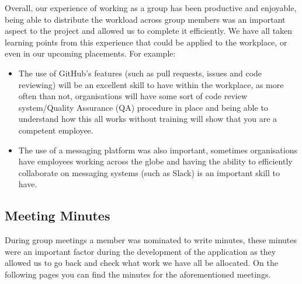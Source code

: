 \documentclass[
  english,
  a4paper,
,tablecaptionabove
]{scrartcl}
\providecommand{\tightlist}{%
  \setlength{\itemsep}{0pt}\setlength{\parskip}{0pt}}
\begin{document}
Overall, our experience of working as a group has been productive and
enjoyable, being able to distribute the workload across group members
was an important aspect to the project and allowed us to complete it
efficiently. We have all taken learning points from this experience that
could be applied to the workplace, or even in our upcoming placements.
For example:

\begin{itemize}
\tightlist
\item
  The use of GitHub's features (such as pull requests, issues and code
  reviewing) will be an excellent skill to have within the workplace, as
  more often than not, organisations will have some sort of code review
  system/Quality Assurance (QA) procedure in place and being able to
  understand how this all works without training will show that you are
  a competent employee.
\item
  The use of a messaging platform was also important, sometimes
  organisations have employees working across the globe and having the
  ability to efficiently collaborate on messaging systems (such as
  Slack) is an important skill to have.
\end{itemize}

\hypertarget{meeting-minutes}{%
\subsection{Meeting Minutes}\label{meeting-minutes}}

During group meetings a member was nominated to write minutes, these
minutes were an important factor during the development of the
application as they allowed us to go back and check what work we have
all be allocated. On the following pages you can find the minutes for
the aforementioned meetings.
\end{document}
